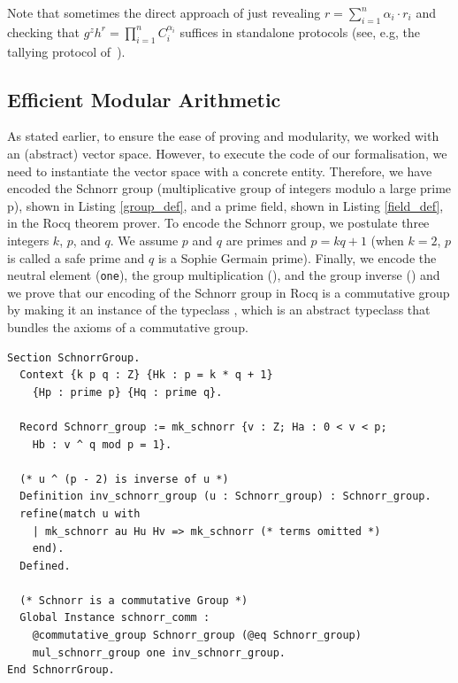 \documentclass[sigconf, anonymous]{acmart}
\begin{document}
Note that sometimes the direct approach of just revealing $r=\sum_{i=1}^{n} \alpha_i \cdot r_i$ and checking that $g^z h^r = \prod_{i=1}^n C_i^{\alpha_i}$ suffices in standalone protocols (see, e.g, the tallying protocol of~\cite{CFSY96}).

\subsection{Efficient Modular Arithmetic}
As stated earlier, to ensure the ease of proving and modularity, 
we worked with an (abstract) vector space. However, to execute the code of 
our formalisation, we need to instantiate the vector space with a concrete entity. 
Therefore, we have encoded the Schnorr group \cite{schnorr1991efficient} (multiplicative 
group of integers modulo a large prime p), shown in Listing \ref{group_def}, and a prime field, shown in Listing \ref{field_def}, in the Rocq theorem prover. 
To encode the Schnorr group, we postulate three integers $k$, $p$, and $q$. 
We assume $p$ and $q$ are primes and $p = k q + 1$ (when 
$k = 2$, $p$ is called a safe prime and $q$ is a Sophie Germain prime). Finally, we encode the neutral element (\texttt{one}), the group multiplication (\texttt{}), 
and the group inverse (\texttt{}) and we prove that our encoding 
of the Schnorr group in Rocq is a commutative group by making it 
an instance of the typeclass \texttt{}, which is an abstract typeclass that bundles the axioms of a commutative group.


 \begin{lstlisting}[frame=single, language=Coq, caption={Rocq Encoding of the Schnorr Group},
  label={group_def},captionpos=t, basicstyle=\ttfamily\footnotesize,
  abovecaptionskip=-\medskipamount]
Section SchnorrGroup. 
  Context {k p q : Z} {Hk : p = k * q + 1}
    {Hp : prime p} {Hq : prime q}.

  Record Schnorr_group := mk_schnorr {v : Z; Ha : 0 < v < p; 
    Hb : v ^ q mod p = 1}.

  (* u ^ (p - 2) is inverse of u *)
  Definition inv_schnorr_group (u : Schnorr_group) : Schnorr_group.
  refine(match u with 
    | mk_schnorr au Hu Hv => mk_schnorr (* terms omitted *)
    end).
  Defined.

  (* Schnorr is a commutative Group *)
  Global Instance schnorr_comm : 
    @commutative_group Schnorr_group (@eq Schnorr_group) 
    mul_schnorr_group one inv_schnorr_group.
End SchnorrGroup.
\end{lstlisting}
\end{document}
